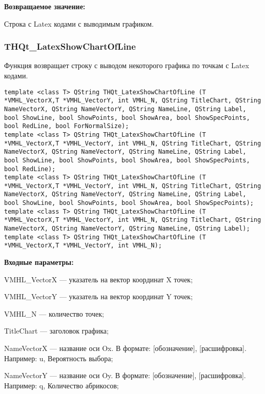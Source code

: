 \documentclass[a4paper,12pt]{article}
\begin{document}
\textbf{Возвращаемое значение:}

Строка с Latex кодами с выводимым графиком.


\subsubsection{THQt\_LatexShowChartOfLine}\label{THQt_LatexShowChartOfLine}

Функция возвращает строку с выводом некоторого графика по точкам с Latex кодами.


\begin{lstlisting}[label=code_syntax_THQt_LatexShowChartOfLine,caption=Синтаксис]
template <class T> QString THQt_LatexShowChartOfLine (T *VMHL_VectorX,T *VMHL_VectorY, int VMHL_N, QString TitleChart, QString NameVectorX, QString NameVectorY, QString NameLine, QString Label, bool ShowLine, bool ShowPoints, bool ShowArea, bool ShowSpecPoints, bool RedLine, bool ForNormalSize);
template <class T> QString THQt_LatexShowChartOfLine (T *VMHL_VectorX,T *VMHL_VectorY, int VMHL_N, QString TitleChart, QString NameVectorX, QString NameVectorY, QString NameLine, QString Label, bool ShowLine, bool ShowPoints, bool ShowArea, bool ShowSpecPoints, bool RedLine);
template <class T> QString THQt_LatexShowChartOfLine (T *VMHL_VectorX,T *VMHL_VectorY, int VMHL_N, QString TitleChart, QString NameVectorX, QString NameVectorY, QString NameLine, QString Label, bool ShowLine, bool ShowPoints, bool ShowArea, bool ShowSpecPoints);
template <class T> QString THQt_LatexShowChartOfLine (T *VMHL_VectorX,T *VMHL_VectorY, int VMHL_N, QString TitleChart, QString NameVectorX, QString NameVectorY, QString NameLine, QString Label);
template <class T> QString THQt_LatexShowChartOfLine (T *VMHL_VectorX,T *VMHL_VectorY, int VMHL_N);

\end{lstlisting}

\textbf{Входные параметры:}

    VMHL\_VectorX --- указатель на вектор координат X точек;
 
    VMHL\_VectorY --- указатель на вектор координат Y точек;
 
    VMHL\_N --- количество точек;
 
    TitleChart --- заголовок графика;
 
    NameVectorX --- название оси Ox. В формате: [обозначение], [расшифровка]. Например: u, Вероятность выбора;
 
    NameVectorY --- название оси Oy. В формате: [обозначение], [расшифровка]. Например: q, Количество абрикосов;
 
\end{document}
